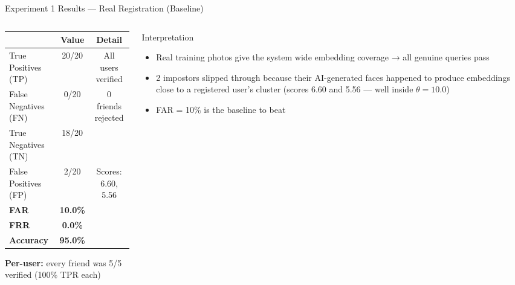 \documentclass[aspectratio=169]{beamer}
\begin{document}
\begin{frame}{Experiment 1 Results — Real Registration (Baseline)}

\begin{columns}[T]
\begin{column}{0.5\textwidth}
    \begin{center}
    \begin{tabular}{lcc}
    \toprule
    & \textbf{Value} & \textbf{Detail} \\
    \midrule
    True Positives (TP) & 20/20 & All users verified \\
    False Negatives (FN) & 0/20  & 0 friends rejected \\
    True Negatives (TN) & 18/20 & \\
    False Positives (FP) & 2/20  & Scores: 6.60, 5.56 \\
    \midrule
    \textbf{FAR} & \textbf{10.0\%} & \\
    \textbf{FRR} & \textbf{0.0\%}  & \\
    \textbf{Accuracy} & \textbf{95.0\%} & \\
    \bottomrule
    \end{tabular}
    \end{center}

    \vspace{8pt}
    \textbf{Per-user:} every friend was 5/5 verified (100\% TPR each)
\end{column}
\begin{column}{0.46\textwidth}
    \begin{block}{Interpretation}
        \begin{itemize}
            \item Real training photos give the system wide embedding coverage → all genuine queries pass
            \item 2 impostors slipped through because their AI-generated faces happened to produce embeddings close to a registered user's cluster (scores 6.60 and 5.56 — well inside $\theta = 10.0$)
            \item FAR = 10\% is the baseline to beat
        \end{itemize}
    \end{block}
\end{column}
\end{columns}
\end{frame}
\end{document}
